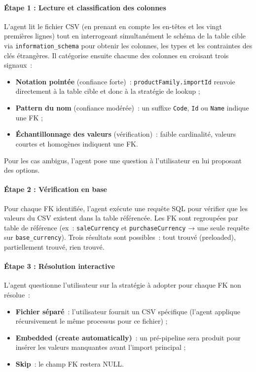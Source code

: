 \paragraph{Étape 1 : Lecture et classification des colonnes} L'agent lit le fichier CSV (en prenant en compte les en-têtes et les vingt premières lignes) tout en interrogeant simultanément le schéma de la table cible via \texttt{information\_schema} pour obtenir les colonnes, les types et les contraintes des clés étrangères. Il catégorise ensuite chacune des colonnes en croisant trois signaux~:
\begin{itemize}
    \item \textbf{Notation pointée} (confiance forte)~: \texttt{productFamily.importId} renvoie directement à la table cible et donc à la stratégie de lookup ;
    \item \textbf{Pattern du nom} (confiance modérée)~: un suffixe \texttt{Code}, \texttt{Id} ou \texttt{Name} indique une FK ;
    \item \textbf{Échantillonnage des valeurs} (vérification)~: faible cardinalité, valeurs courtes et homogènes indiquent une FK.
\end{itemize}
Pour les cas ambigus, l'agent pose une question à l'utilisateur en lui proposant des options.

\paragraph{Étape 2 : Vérification en base} Pour chaque FK identifiée, l'agent exécute une requête SQL pour vérifier que les valeurs du CSV existent dans la table référencée. Les FK sont regroupées par table de référence (ex~: \texttt{saleCurrency} et \texttt{purchaseCurrency} → une seule requête sur \texttt{base\_currency}). Trois résultats sont possibles~: tout trouvé (preloaded), partiellement trouvé, rien trouvé.

\paragraph{Étape 3 : Résolution interactive} L'agent questionne l'utilisateur sur la stratégie à adopter pour chaque FK non résolue~:
\begin{itemize}
    \item \textbf{Fichier séparé}~: l'utilisateur fournit un CSV spécifique (l'agent applique récursivement le même processus pour ce fichier) ;
    \item \textbf{Embedded (create automatically)}~: un pré-pipeline sera produit pour insérer les valeurs manquantes avant l'import principal ;
    \item \textbf{Skip}~: le champ FK restera NULL.
\end{itemize}


